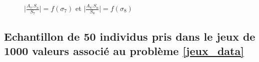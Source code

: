 \documentclass[a4paper]{article}
\begin{document}
\begin{appendices}
\begin{figure}[H]
\hfill
{}
\caption{    $\vert\frac{A_{7}.S_{n}}{S_{7}}\vert=f(\sigma_{7})$ et  $\vert\frac{A_{8}.S_{n}}{S_{8}}\vert=f(\sigma_{8})$       }\label{fig:somefiglabel}
\end{figure}

\newpage

\subsection{Echantillon de 50 individus pris dans le jeux de 1000 valeurs associé au problème \ref{jeux_data}}
\label{creat_gener}


\end{appendices}
\end{document}

